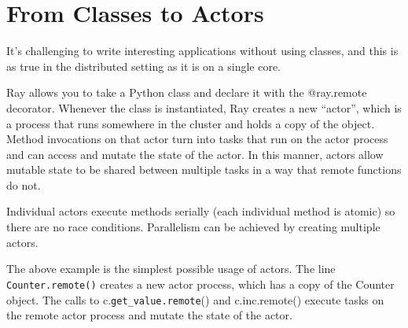 \section{From Classes to Actors}
It’s challenging to write interesting applications without using classes, and this is as true in the distributed setting as it is on a single core.

Ray allows you to take a Python class and declare it with the @ray.remote decorator. Whenever the class is instantiated, Ray creates a new “actor”, which is a process that runs somewhere in the cluster and holds a copy of the object. Method invocations on that actor turn into tasks that run on the actor process and can access and mutate the state of the actor. In this manner, actors allow mutable state to be shared between multiple tasks in a way that remote functions do not.

Individual actors execute methods serially (each individual method is atomic) so there are no race conditions. Parallelism can be achieved by creating multiple actors.


    The above example is the simplest possible usage of actors. The line \verb|Counter.remote()| creates a new actor process, which has a copy of the Counter object. The calls to c.\verb|get_value.remote|() and c.inc.remote() execute tasks on the remote actor process and mutate the state of the actor.